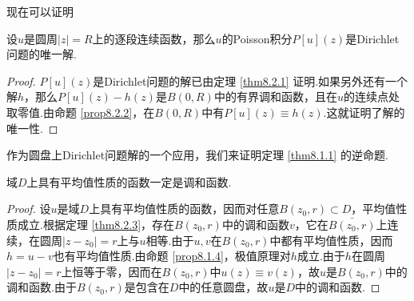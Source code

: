 现在可以证明
\begin{theorem}\label{thm8.2.3}
  设$u$是圆周$|z|=R$上的逐段连续函数，那么$u$的Poisson积分$P[u](z)$是Dirichlet问题的唯一解.
\end{theorem}
\begin{proof}
  $P[u](z)$是Dirichlet问题的解已由定理 \ref{thm8.2.1} 证明.如果另外还有一个解$h$，那么$P[u](z)-h(z)$是$B(0,R)$中的有界调和函数，且在$u$的连续点处取零值.由命题 \ref{prop8.2.2}，在$B(0,R)$中有$P[u](z)\equiv h(z)$.这就证明了解的唯一性.
\end{proof}

作为圆盘上Dirichlet问题解的一个应用，我们来证明定理 \ref{thm8.1.1} 的逆命题.
\begin{theorem}\label{thm8.2.4}
  域$D$上具有平均值性质的函数一定是调和函数.
\end{theorem}
\begin{proof}
  设$u$是域$D$上具有平均值性质的函数，因而对任意$B(z_0,r)\subset D$，平均值性质成立.根据定理 \ref{thm8.2.3}，存在$B(z_0,r)$中的调和函数$v$，它在$\bar{B(z_0,r)}$上连续，在圆周$|z-z_0|=r$上与$u$相等.由于$u,v$在$B(z_0,r)$中都有平均值性质，因而$h=u-v$也有平均值性质.由命题 \ref{prop8.1.4}，极值原理对$h$成立.由于$h$在圆周$|z-z_0|=r$上恒等于零，因而在$B(z_0,r)$中$u(z)\equiv v(z)$，故$u$是$B(z_0,r)$中的调和函数.由于$B(z_0,r)$是包含在$D$中的任意圆盘，故$u$是$D$中的调和函数.
\end{proof}

